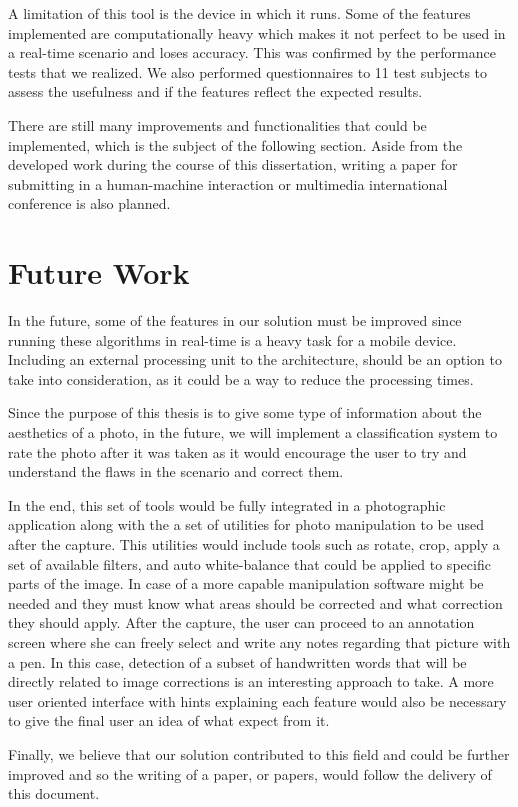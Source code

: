 A limitation of this tool is the device in which it runs. Some of the features implemented are computationally heavy which makes it not perfect to be used in a real-time scenario and loses accuracy. This was confirmed by the performance tests that we realized. We also performed questionnaires to 11 test subjects to assess the usefulness and if the features reflect the expected results. 	

There are still many improvements and functionalities that could be implemented, which is the subject of the following section. Aside from the developed work during the course of this dissertation, writing a paper for submitting in a human-machine interaction or multimedia international conference is also planned.

\section{Future Work}
\label{sec:future}

In the future, some of the features in our solution must be improved since running these algorithms in real-time is a heavy task for a mobile device. Including an external processing unit to the architecture, should be an option to take into consideration, as it could be a way to reduce the processing times.

Since the purpose of this thesis is to give some type of information about the aesthetics of a photo, in the future, we will implement a classification system to rate the photo after it was taken as it would encourage the user to try and understand the flaws in the scenario and correct them.

In the end, this set of tools would be fully integrated in a photographic application along with the a set of utilities for photo manipulation to be used after the capture. This utilities would include tools such as rotate, crop, apply a set of available filters, and auto white-balance that could be applied to specific parts of the image. In case of a more capable manipulation software might be needed and they must know what areas should be corrected and what correction they should apply. After the capture, the user can proceed to an annotation screen where she can freely select and write any notes regarding that picture with a pen. In this case, detection of a subset of handwritten words that will be directly related to image corrections is an interesting approach to take. A more user oriented interface with hints explaining each feature would also be necessary to give the final user an idea of what expect from it.

Finally, we believe that our solution contributed to this field and could be further improved and so the writing of a paper, or papers, would follow the delivery of this document.